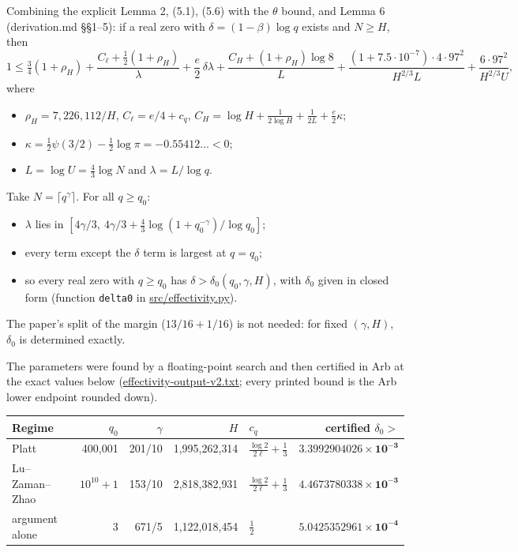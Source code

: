 \documentclass[11pt]{article}
\begin{document}
Combining the explicit Lemma 2, (5.1), (5.6) with the $\theta$ bound, and Lemma 6 (derivation.md \S\S1--5): if a real zero with $\delta=(1-\beta)\log q$ exists and $N\ge H$, then
\[
1 \le \tfrac34(1+\rho_H) + \frac{C_\ell+\frac12(1+\rho_H)}{\lambda} + \frac e2\,\delta\lambda + \frac{C_H+(1+\rho_H)\log 8}{L} + \frac{(1+7.5\cdot10^{-7})\cdot 4\cdot 97^2}{H^{2/3}L} + \frac{6\cdot 97^2}{H^{2/3}U},
\]
where
\begin{itemize}
\item $\rho_H = 7{,}226{,}112/H$, $C_\ell = e/4 + c_q$, $C_H = \log H + \frac{1}{2\log H} + \frac{1}{2L} + \frac e2\kappa$;
\item $\kappa = \tfrac12\psi(3/2) - \tfrac12\log\pi = -0.55412\ldots < 0$;
\item $L = \log U = \tfrac43\log N$ and $\lambda = L/\log q$.
\end{itemize}
Take $N=\lceil q^\gamma\rceil$. For all $q\ge q_0$:
\begin{itemize}
\item $\lambda$ lies in $[4\gamma/3,\ 4\gamma/3 + \tfrac43\log(1+q_0^{-\gamma})/\log q_0]$;
\item every term except the $\delta$ term is largest at $q=q_0$;
\item so every real zero with $q\ge q_0$ has $\delta>\delta_0(q_0,\gamma,H)$, with $\delta_0$ given in closed form (function \texttt{delta0} in \url{src/effectivity.py}).
\end{itemize}
The paper's split of the margin ($13/16+1/16$) is not needed: for fixed $(\gamma,H)$, $\delta_0$ is determined exactly.

The parameters were found by a floating-point search and then certified in Arb at the exact values below (\url{effectivity-output-v2.txt}; every printed bound is the Arb lower endpoint rounded down).

\begin{center}
\begin{tabular}{@{}lrrrlr@{}}
\toprule
Regime & $q_0$ & $\gamma$ & $H$ & $c_q$ & certified $\delta_0 >$\\
\midrule
Platt & 400{,}001 & 201/10 & 1{,}995{,}262{,}314 & $\frac{\log 2}{2\ell}+\frac13$ & $\mathbf{3.3992904026\times10^{-3}}$\\
Lu--Zaman--Zhao & $10^{10}+1$ & 153/10 & 2{,}818{,}382{,}931 & $\frac{\log 2}{2\ell}+\frac13$ & $\mathbf{4.4673780338\times10^{-3}}$\\
argument alone & 3 & 671/5 & 1{,}122{,}018{,}454 & $\frac12$ & $\mathbf{5.0425352961\times10^{-4}}$\\
\bottomrule
\end{tabular}
\end{center}
\end{document}
